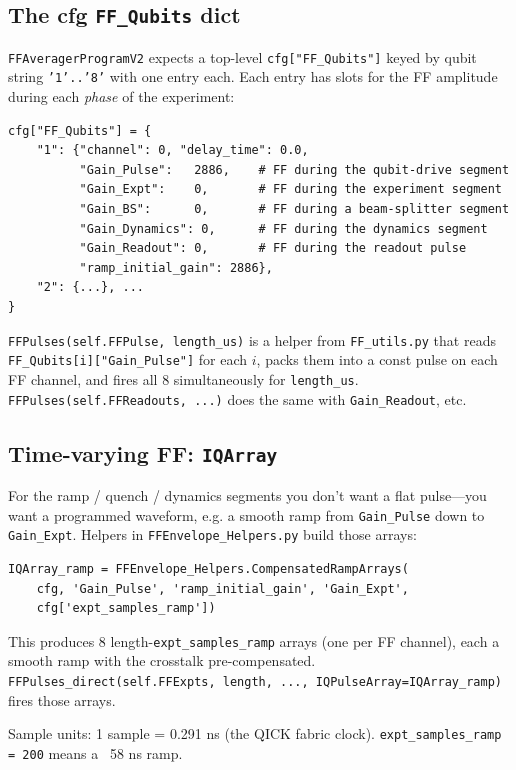 \documentclass[11pt,letterpaper]{article}
\begin{document}
\subsection{The cfg \texttt{FF\_Qubits} dict}
\texttt{FFAveragerProgramV2} expects a top-level \texttt{cfg["FF\_Qubits"]} keyed by qubit string \texttt{'1'..'8'} with one entry each. Each entry has slots for the FF amplitude during each \emph{phase} of the experiment:
\begin{lstlisting}
cfg["FF_Qubits"] = {
    "1": {"channel": 0, "delay_time": 0.0,
          "Gain_Pulse":   2886,    # FF during the qubit-drive segment
          "Gain_Expt":    0,       # FF during the experiment segment
          "Gain_BS":      0,       # FF during a beam-splitter segment
          "Gain_Dynamics": 0,      # FF during the dynamics segment
          "Gain_Readout": 0,       # FF during the readout pulse
          "ramp_initial_gain": 2886},
    "2": {...}, ...
}
\end{lstlisting}
\texttt{FFPulses(self.FFPulse, length\_us)} is a helper from \texttt{FF\_utils.py} that reads \texttt{FF\_Qubits[i]["Gain\_Pulse"]} for each \(i\), packs them into a const pulse on each FF channel, and fires all 8 simultaneously for \texttt{length\_us}. \texttt{FFPulses(self.FFReadouts, ...)} does the same with \texttt{Gain\_Readout}, etc.

\subsection{Time-varying FF: \texttt{IQArray}}
For the ramp / quench / dynamics segments you don't want a flat pulse---you want a programmed waveform, e.g. a smooth ramp from \texttt{Gain\_Pulse} down to \texttt{Gain\_Expt}. Helpers in \texttt{FFEnvelope\_Helpers.py} build those arrays:
\begin{lstlisting}
IQArray_ramp = FFEnvelope_Helpers.CompensatedRampArrays(
    cfg, 'Gain_Pulse', 'ramp_initial_gain', 'Gain_Expt',
    cfg['expt_samples_ramp'])
\end{lstlisting}
This produces 8 length-\texttt{expt\_samples\_ramp} arrays (one per FF channel), each a smooth ramp with the crosstalk pre-compensated. \texttt{FFPulses\_direct(self.FFExpts, length, ..., IQPulseArray=IQArray\_ramp)} fires those arrays.

\begin{notebox}
Sample units: 1 sample = 0.291 ns (the QICK fabric clock). \texttt{expt\_samples\_ramp = 200} means a ~58 ns ramp.
\end{notebox}
\end{document}
